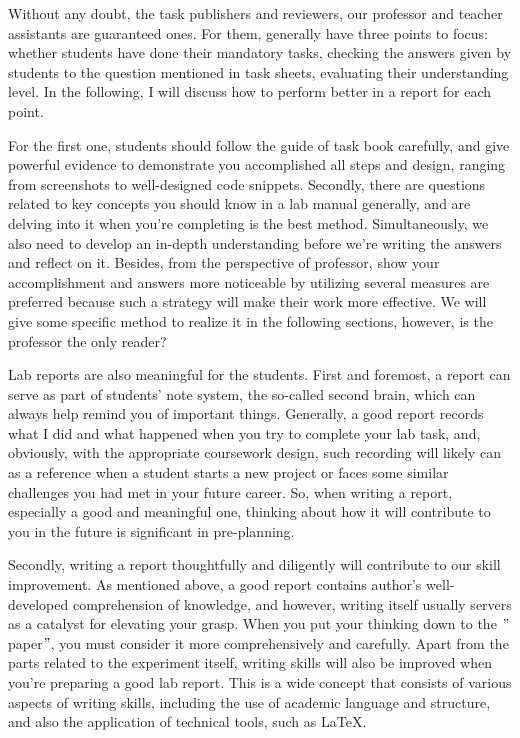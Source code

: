 \documentclass[12pt]{article}
\begin{document}
Without any doubt, the task publishers and reviewers, our professor and teacher assistants are guaranteed ones.
For them, generally have three points to focus: whether students have done their mandatory tasks, checking the answers given by students to the question mentioned in task sheets, evaluating their understanding level. 
In the following, I will discuss how to perform better in a report for each point.

For the first one, students should follow the guide of task book carefully, and give powerful evidence to demonstrate you accomplished all steps and design, ranging from screenshots to well-designed code snippets.
Secondly, there are questions related to key concepts you should know in a lab manual generally, and are delving into it when you're completing is the best method.
Simultaneously, we also need to develop an in-depth understanding before we're writing the answers and reflect on it.
Besides, from the perspective of professor, show your accomplishment and answers more noticeable by utilizing several measures are preferred because such a strategy will make their work more effective.
We will give some specific method to realize it in the following sections, however, is the professor the only reader?

Lab reports are also meaningful for the students.
First and foremost, a report can serve as part of students' note system, the so-called second brain, which can always help remind you of important things.
Generally, a good report records what I did and what happened when you try to complete your lab task, and, obviously, with the appropriate coursework design, such recording will likely can as a reference when a student starts a new project or faces some similar challenges you had met in your future career.
So, when writing a report, especially a good and meaningful one, thinking about how it will contribute to you in the future is significant in pre-planning.

Secondly, writing a report thoughtfully and diligently will contribute to our skill improvement.
As mentioned above, a good report contains author's well-developed comprehension of knowledge, and however, writing itself usually servers as a catalyst for elevating your grasp.
When you put your thinking down to the \("\)paper\("\), you must consider it more comprehensively and carefully.
Apart from the parts related to the experiment itself, writing skills will also be improved when you're preparing a good lab report.
This is a wide concept that consists of various aspects of writing skills, including the use of academic language and structure, and also the application of technical tools, such as \LaTeX.
\end{document}

